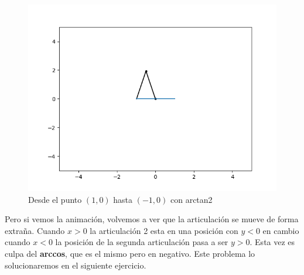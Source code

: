 \documentclass[12pt,a4paper]{report}
\begin{document}
\begin{figure}[H]
	\centering
	\includegraphics[width=0.7\linewidth]{img/Tercer_apartado-Eje_9-b.png}
	\caption{Desde el punto $(1,0)$ hasta $(-1,0)$ con arctan2}
	\label{fig:ej9-c-b}
\end{figure}
Pero si vemos la animación, volvemos a ver que la articulación se mueve de forma extraña. Cuando $x>0$ la articulación 2 esta en una posición con $y<0$ en cambio cuando $x<0$ la posición de la segunda articulación pasa a ser $y>0$. Esta vez es culpa del \textbf{arccos}, que es el mismo pero en negativo. Este problema lo solucionaremos en el siguiente ejercicio. 
\end{document}
